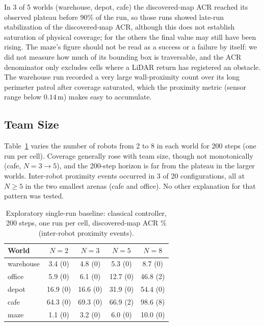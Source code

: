 \documentclass[conference]{IEEEtran}
\newcommand{\si}[1]{\mathrm{#1}}
\begin{document}
In 3 of 5 worlds (warehouse, depot, cafe) the discovered-map ACR reached its observed plateau before 90\% of the run, so those runs showed late-run stabilization of the discovered-map ACR, although this does not establish saturation of physical coverage; for the others the final value may still have been rising. The maze's figure should not be read as a success or a failure
by itself: we did not measure how much of its bounding box is traversable, and
the ACR denominator only excludes cells where a LiDAR return has registered an
obstacle. The warehouse run recorded a very large wall-proximity count over its
long perimeter patrol after coverage saturated, which the proximity metric
(sensor range below $0.14\,\si{m}$) makes easy to accumulate.

\subsection{Team Size}
Table~\ref{tab:sweep} varies the number of robots from 2 to 8 in each world for
200 steps (one run per cell). Coverage generally rose with team size, though not
monotonically (cafe, $N{=}3\to5$), and the 200-step horizon is far from the
plateau in the larger worlds. Inter-robot proximity events occurred in 3 of 20 configurations,
all at $N\ge5$ in the two smallest arenas (cafe and office). No other
explanation for that pattern was tested.

\begin{table}[t]
\centering
\caption{Exploratory single-run baseline: classical controller, 200 steps, one run per cell, discovered-map ACR \% (inter-robot proximity events).}
\label{tab:sweep}
\footnotesize
\begin{tabular}{@{}lcccc@{}}
\toprule
World & $N{=}2$ & $N{=}3$ & $N{=}5$ & $N{=}8$ \\
\midrule
warehouse & 3.4 (0) & 4.8 (0) & 5.3 (0) & 8.7 (0) \\
office & 5.9 (0) & 6.1 (0) & 12.7 (0) & 46.8 (2) \\
depot & 16.9 (0) & 16.6 (0) & 31.9 (0) & 54.4 (0) \\
cafe & 64.3 (0) & 69.3 (0) & 66.9 (2) & 98.6 (8) \\
maze & 1.1 (0) & 3.2 (0) & 6.0 (0) & 10.0 (0) \\
\bottomrule
\end{tabular}
\end{table}
\end{document}
